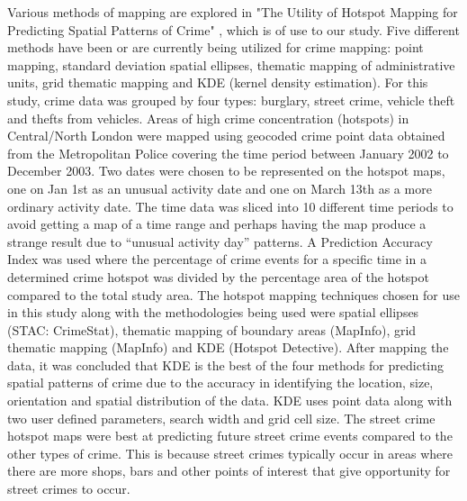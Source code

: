 \documentclass{sigkddExp}
\begin{document}
Various methods of mapping are explored in "The Utility of Hotspot Mapping for Predicting Spatial Patterns of Crime" \cite{Chainey}, which is of use to our study. Five different methods have been or are currently being utilized for crime mapping: point mapping, standard deviation spatial ellipses, thematic mapping of administrative units, grid thematic mapping and KDE (kernel density estimation). For this study, crime data was grouped by four types: burglary, street crime, vehicle theft and thefts from vehicles. Areas of high crime concentration (hotspots) in Central/North London were mapped using geocoded crime point data obtained from the Metropolitan Police covering the time period between January 2002 to December 2003. Two dates were chosen to be represented on the hotspot maps, one on Jan 1st as an unusual activity date and one on March 13th as a more ordinary activity date. The time data was sliced into 10 different time periods to avoid getting a map of a time range and perhaps having the map produce a strange result due to “unusual activity day” patterns. A Prediction Accuracy Index was used where the percentage of crime events for a specific time in a determined crime hotspot was divided by the percentage area of the hotspot compared to the total study area. The hotspot mapping techniques chosen for use in this study along with the methodologies being used were spatial ellipses (STAC: CrimeStat), thematic mapping of boundary areas (MapInfo), grid thematic mapping (MapInfo) and KDE (Hotspot Detective). After mapping the data, it was concluded that KDE is the best of the four methods for predicting spatial patterns of crime due to the accuracy in identifying the location, size, orientation and spatial distribution of the data. KDE uses point data along with two user defined parameters, search width and grid cell size. The street crime hotspot maps were best at predicting future street crime events compared to the other types of crime. This is because street crimes typically occur in areas where there are more shops, bars and other points of interest that give opportunity for street crimes to occur. 
\end{document}
